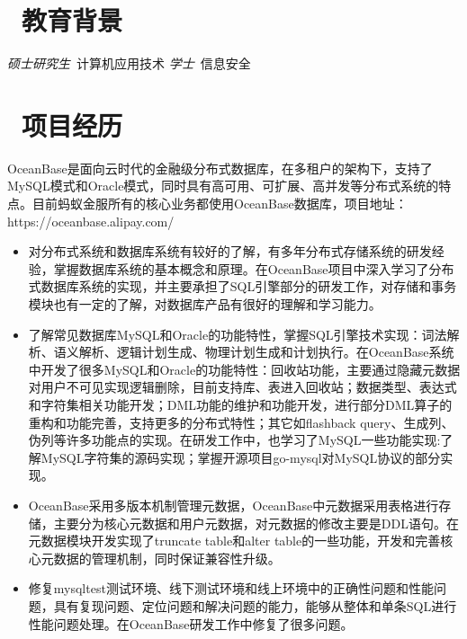 \documentclass{resume}
\begin{document}


\section{\faGraduationCap\  教育背景}
\textit{硕士研究生}\ 计算机应用技术
\datedsubsection{\textbf{电子科技大学}}{2009 -- 2013}
\textit{学士}\ 信息安全\

\section{\faUsers\ 项目经历}
OceanBase是面向云时代的金融级分布式数据库，在多租户的架构下，支持了MySQL模式和Oracle模式，同时具有高可用、可扩展、高并发等分布式系统的特点。目前蚂蚁金服所有的核心业务都使用OceanBase数据库，项目地址：https://oceanbase.alipay.com/
\begin{itemize}
  \item 对分布式系统和数据库系统有较好的了解，有多年分布式存储系统的研发经验，掌握数据库系统的基本概念和原理。在OceanBase项目中深入学习了分布式数据库系统的实现，并主要承担了SQL引擎部分的研发工作，对存储和事务模块也有一定的了解，对数据库产品有很好的理解和学习能力。
  \item 了解常见数据库MySQL和Oracle的功能特性，掌握SQL引擎技术实现：词法解析、语义解析、逻辑计划生成、物理计划生成和计划执行。在OceanBase系统中开发了很多MySQL和Oracle的功能特性：回收站功能，主要通过隐藏元数据对用户不可见实现逻辑删除，目前支持库、表进入回收站；数据类型、表达式和字符集相关功能开发；DML功能的维护和功能开发，进行部分DML算子的重构和功能完善，支持更多的分布式特性；其它如flashback query、生成列、伪列等许多功能点的实现。在研发工作中，也学习了MySQL一些功能实现:了解MySQL字符集的源码实现；掌握开源项目go-mysql对MySQL协议的部分实现。
  \item OceanBase采用多版本机制管理元数据，OceanBase中元数据采用表格进行存储，主要分为核心元数据和用户元数据，对元数据的修改主要是DDL语句。在元数据模块开发实现了truncate table和alter table的一些功能，开发和完善核心元数据的管理机制，同时保证兼容性升级。
  \item 修复mysqltest测试环境、线下测试环境和线上环境中的正确性问题和性能问题，具有复现问题、定位问题和解决问题的能力，能够从整体和单条SQL进行性能问题处理。在OceanBase研发工作中修复了很多问题。
\end{itemize}
\end{document}
